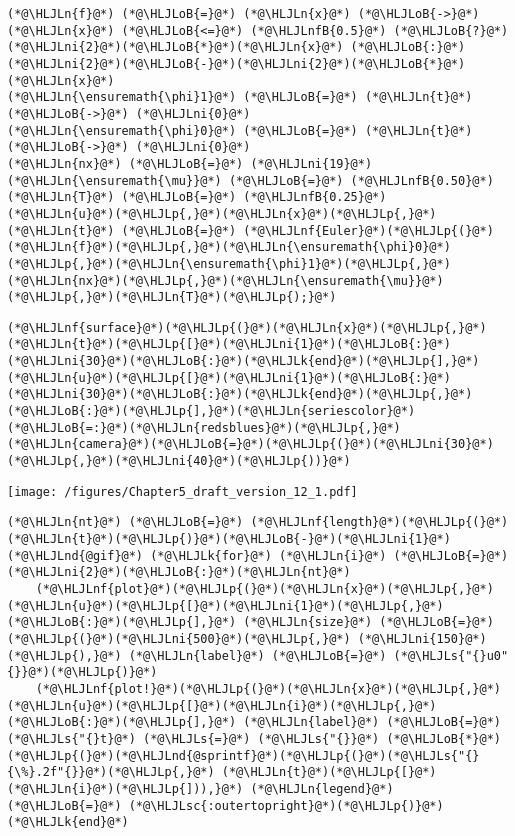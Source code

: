 \documentclass[12pt,landscape]{article}
\newcommand{\HLJLk}[1]{\textcolor[RGB]{148,91,176}{\textbf{#1}}}
\newcommand{\HLJLn}[1]{#1}
\newcommand{\HLJLnd}[1]{\textcolor[RGB]{214,102,97}{#1}}
\newcommand{\HLJLnf}[1]{\textcolor[RGB]{66,102,213}{#1}}
\newcommand{\HLJLs}[1]{\textcolor[RGB]{201,61,57}{#1}}
\newcommand{\HLJLsc}[1]{\textcolor[RGB]{201,61,57}{#1}}
\newcommand{\HLJLnfB}[1]{\textcolor[RGB]{59,151,46}{#1}}
\newcommand{\HLJLni}[1]{\textcolor[RGB]{59,151,46}{#1}}
\newcommand{\HLJLoB}[1]{\textcolor[RGB]{102,102,102}{\textbf{#1}}}
\newcommand{\HLJLp}[1]{#1}
\begin{document}
{\begin{lstlisting}
(*@\HLJLn{f}@*) (*@\HLJLoB{=}@*) (*@\HLJLn{x}@*) (*@\HLJLoB{->}@*) (*@\HLJLn{x}@*) (*@\HLJLoB{<=}@*) (*@\HLJLnfB{0.5}@*) (*@\HLJLoB{?}@*) (*@\HLJLni{2}@*)(*@\HLJLoB{*}@*)(*@\HLJLn{x}@*) (*@\HLJLoB{:}@*) (*@\HLJLni{2}@*)(*@\HLJLoB{-}@*)(*@\HLJLni{2}@*)(*@\HLJLoB{*}@*)(*@\HLJLn{x}@*)
(*@\HLJLn{\ensuremath{\phi}1}@*) (*@\HLJLoB{=}@*) (*@\HLJLn{t}@*) (*@\HLJLoB{->}@*) (*@\HLJLni{0}@*)
(*@\HLJLn{\ensuremath{\phi}0}@*) (*@\HLJLoB{=}@*) (*@\HLJLn{t}@*) (*@\HLJLoB{->}@*) (*@\HLJLni{0}@*)
(*@\HLJLn{nx}@*) (*@\HLJLoB{=}@*) (*@\HLJLni{19}@*)
(*@\HLJLn{\ensuremath{\mu}}@*) (*@\HLJLoB{=}@*) (*@\HLJLnfB{0.50}@*)
(*@\HLJLn{T}@*) (*@\HLJLoB{=}@*) (*@\HLJLnfB{0.25}@*)
(*@\HLJLn{u}@*)(*@\HLJLp{,}@*)(*@\HLJLn{x}@*)(*@\HLJLp{,}@*)(*@\HLJLn{t}@*) (*@\HLJLoB{=}@*) (*@\HLJLnf{Euler}@*)(*@\HLJLp{(}@*)(*@\HLJLn{f}@*)(*@\HLJLp{,}@*)(*@\HLJLn{\ensuremath{\phi}0}@*)(*@\HLJLp{,}@*)(*@\HLJLn{\ensuremath{\phi}1}@*)(*@\HLJLp{,}@*)(*@\HLJLn{nx}@*)(*@\HLJLp{,}@*)(*@\HLJLn{\ensuremath{\mu}}@*)(*@\HLJLp{,}@*)(*@\HLJLn{T}@*)(*@\HLJLp{);}@*)
\end{lstlisting}


\begin{lstlisting}
(*@\HLJLnf{surface}@*)(*@\HLJLp{(}@*)(*@\HLJLn{x}@*)(*@\HLJLp{,}@*)(*@\HLJLn{t}@*)(*@\HLJLp{[}@*)(*@\HLJLni{1}@*)(*@\HLJLoB{:}@*)(*@\HLJLni{30}@*)(*@\HLJLoB{:}@*)(*@\HLJLk{end}@*)(*@\HLJLp{],}@*)(*@\HLJLn{u}@*)(*@\HLJLp{[}@*)(*@\HLJLni{1}@*)(*@\HLJLoB{:}@*)(*@\HLJLni{30}@*)(*@\HLJLoB{:}@*)(*@\HLJLk{end}@*)(*@\HLJLp{,}@*)(*@\HLJLoB{:}@*)(*@\HLJLp{],}@*)(*@\HLJLn{seriescolor}@*)(*@\HLJLoB{=:}@*)(*@\HLJLn{redsblues}@*)(*@\HLJLp{,}@*) (*@\HLJLn{camera}@*)(*@\HLJLoB{=}@*)(*@\HLJLp{(}@*)(*@\HLJLni{30}@*)(*@\HLJLp{,}@*)(*@\HLJLni{40}@*)(*@\HLJLp{))}@*)
\end{lstlisting}

\texttt{[image: /figures/Chapter5\_draft\_version\_12\_1.pdf]}

\begin{lstlisting}
(*@\HLJLn{nt}@*) (*@\HLJLoB{=}@*) (*@\HLJLnf{length}@*)(*@\HLJLp{(}@*)(*@\HLJLn{t}@*)(*@\HLJLp{)}@*)(*@\HLJLoB{-}@*)(*@\HLJLni{1}@*)
(*@\HLJLnd{@gif}@*) (*@\HLJLk{for}@*) (*@\HLJLn{i}@*) (*@\HLJLoB{=}@*) (*@\HLJLni{2}@*)(*@\HLJLoB{:}@*)(*@\HLJLn{nt}@*) 
    (*@\HLJLnf{plot}@*)(*@\HLJLp{(}@*)(*@\HLJLn{x}@*)(*@\HLJLp{,}@*) (*@\HLJLn{u}@*)(*@\HLJLp{[}@*)(*@\HLJLni{1}@*)(*@\HLJLp{,}@*)(*@\HLJLoB{:}@*)(*@\HLJLp{],}@*) (*@\HLJLn{size}@*) (*@\HLJLoB{=}@*) (*@\HLJLp{(}@*)(*@\HLJLni{500}@*)(*@\HLJLp{,}@*) (*@\HLJLni{150}@*)(*@\HLJLp{),}@*) (*@\HLJLn{label}@*) (*@\HLJLoB{=}@*) (*@\HLJLs{"{}u0"{}}@*)(*@\HLJLp{)}@*)
    (*@\HLJLnf{plot!}@*)(*@\HLJLp{(}@*)(*@\HLJLn{x}@*)(*@\HLJLp{,}@*) (*@\HLJLn{u}@*)(*@\HLJLp{[}@*)(*@\HLJLn{i}@*)(*@\HLJLp{,}@*)(*@\HLJLoB{:}@*)(*@\HLJLp{],}@*) (*@\HLJLn{label}@*) (*@\HLJLoB{=}@*) (*@\HLJLs{"{}t}@*) (*@\HLJLs{=}@*) (*@\HLJLs{"{}}@*) (*@\HLJLoB{*}@*) (*@\HLJLp{(}@*)(*@\HLJLnd{@sprintf}@*)(*@\HLJLp{(}@*)(*@\HLJLs{"{}{\%}.2f"{}}@*)(*@\HLJLp{,}@*) (*@\HLJLn{t}@*)(*@\HLJLp{[}@*)(*@\HLJLn{i}@*)(*@\HLJLp{])),}@*) (*@\HLJLn{legend}@*) (*@\HLJLoB{=}@*) (*@\HLJLsc{:outertopright}@*)(*@\HLJLp{)}@*)
(*@\HLJLk{end}@*)
\end{lstlisting}

}
\end{document}

